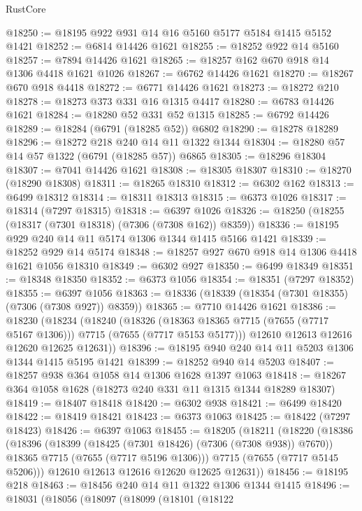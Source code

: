 \begin{lexlean}{RustCore}
\begin{coremodule}
@18250 := @18195 @922 @931 @14 @16 @5160 @5177 @5184 @1415 @5152 @1421
@18252 := @6814 @14426 @1621
@18255 := @18252 @922 @14 @5160
@18257 := @7894 @14426 @1621
@18265 := @18257 @162 @670 @918 @14 @1306 @4418 @1621 @1026
@18267 := @6762 @14426 @1621
@18270 := @18267 @670 @918 @4418
@18272 := @6771 @14426 @1621
@18273 := @18272 @210
@18278 := @18273 @373 @331 @16 @1315 @4417
@18280 := @6783 @14426 @1621
@18284 := @18280 @52 @331 @52 @1315
@18285 := @6792 @14426
@18289 := @18284 (@6791 (@18285 @52)) @6802
@18290 := @18278 @18289
@18296 := @18272 @218 @240 @14 @11 @1322 @1344
@18304 := @18280 @57 @14 @57 @1322 (@6791 (@18285 @57)) @6865
@18305 := @18296 @18304
@18307 := @7041 @14426 @1621
@18308 := @18305 @18307
@18310 := @18270 (@18290 @18308)
@18311 := @18265 @18310
@18312 := @6302 @162
@18313 := @6499 @18312
@18314 := @18311 @18313
@18315 := @6373 @1026
@18317 := @18314 (@7297 @18315)
@18318 := @6397 @1026
@18326 := @18250 (@18255 (@18317 (@7301 @18318) (@7306 (@7308 @162)) @8359))
@18336 := @18195 @929 @240 @14 @11 @5174 @1306 @1344 @1415 @5166 @1421
@18339 := @18252 @929 @14 @5174
@18348 := @18257 @927 @670 @918 @14 @1306 @4418 @1621 @1056 @18310
@18349 := @6302 @927
@18350 := @6499 @18349
@18351 := @18348 @18350
@18352 := @6373 @1056
@18354 := @18351 (@7297 @18352)
@18355 := @6397 @1056
@18363 := @18336 (@18339 (@18354 (@7301 @18355) (@7306 (@7308 @927)) @8359))
@18365 := @7710 @14426 @1621
@18386 := @18230
    (@18234
      (@18240
        (@18326 (@18363 @18365 @7715 (@7655 (@7717 @5167 @1306))) @7715 (@7655 (@7717 @5153 @5177)))
        @12610
        @12613
        @12616
        @12620
        @12625
        @12631))
@18396 := @18195 @940 @240 @14 @11 @5203 @1306 @1344 @1415 @5195 @1421
@18399 := @18252 @940 @14 @5203
@18407 := @18257 @938 @364 @1058 @14 @1306 @1628 @1397 @1063
@18418 := @18267 @364 @1058 @1628 (@18273 @240 @331 @11 @1315 @1344 @18289 @18307)
@18419 := @18407 @18418
@18420 := @6302 @938
@18421 := @6499 @18420
@18422 := @18419 @18421
@18423 := @6373 @1063
@18425 := @18422 (@7297 @18423)
@18426 := @6397 @1063
@18455 := @18205
    (@18211
      (@18220
        (@18386
          (@18396
            (@18399 (@18425 (@7301 @18426) (@7306 (@7308 @938)) @7670))
            @18365
            @7715
            (@7655 (@7717 @5196 @1306)))
          @7715
          (@7655 (@7717 @5145 @5206)))
        @12610
        @12613
        @12616
        @12620
        @12625
        @12631))
@18456 := @18195 @218
@18463 := @18456 @240 @14 @11 @1322 @1306 @1344 @1415
@18496 := @18031
    (@18056
      (@18097
        (@18099
          (@18101
            (@18122

\end{coremodule}
\end{lexlean}

